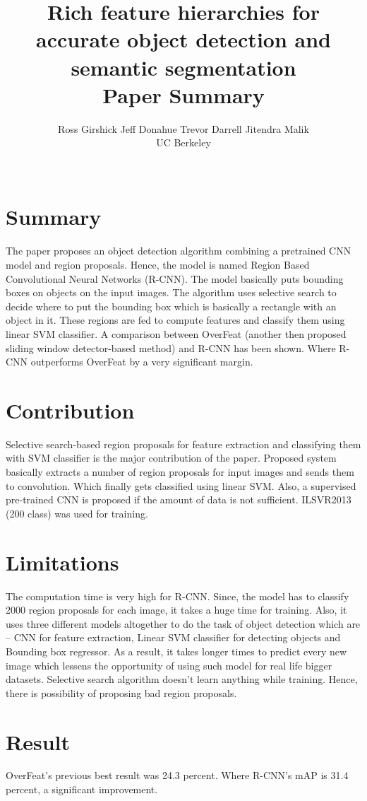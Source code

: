 \documentclass{article}
\title{Rich feature hierarchies for accurate object detection and semantic segmentation \large 
\\Paper Summary}
\author{Ross Girshick Jeff Donahue Trevor Darrell Jitendra Malik\\
  \small UC Berkeley\\\\
}
\date{\vspace{-5ex}}
\begin{document}
\maketitle

\section{Summary}
The paper proposes an object detection algorithm combining a pretrained CNN model and region proposals. Hence, the model is named Region Based Convolutional Neural Networks (R-CNN). The model basically puts bounding boxes on objects on the input images. The algorithm uses selective search to decide where to put the bounding box which is basically a rectangle with an object in it. These regions are fed to compute features and classify them using linear SVM classifier. A comparison between OverFeat (another then proposed sliding window detector-based method) and R-CNN has been shown. Where R-CNN outperforms OverFeat by a very significant margin.

\section{Contribution}
Selective search-based region proposals for feature extraction and classifying them with SVM classifier is the major contribution of the paper. Proposed system basically extracts a number of region proposals for input images and sends them to convolution. Which finally gets classified using linear SVM. Also, a supervised pre-trained CNN is proposed if the amount of data is not sufficient. ILSVR2013 (200 class) was used for training. 

\section{Limitations}
The computation time is very high for R-CNN. Since, the model has to classify 2000 region proposals for each image, it takes a huge time for training. Also, it uses three different models altogether to do the task of object detection which are – CNN for feature extraction, Linear SVM classifier for detecting objects and Bounding box regressor. As a result, it takes longer times to predict every new image which lessens the opportunity of using such model for real life bigger datasets. Selective search algorithm doesn’t learn anything while training. Hence, there is possibility of proposing bad region proposals.

\section{Result}
OverFeat's previous best result was 24.3 percent. Where R-CNN’s mAP is 31.4 percent, a significant improvement.
\end{document}
